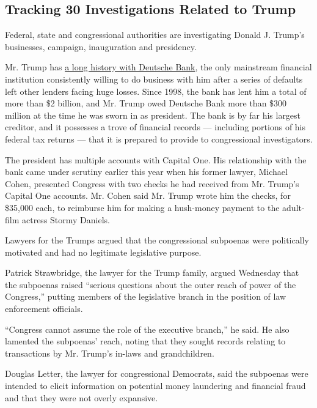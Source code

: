 \hypertarget{tracking-30-investigations-related-to-trump}{%
\subsection{Tracking 30 Investigations Related to
Trump}\label{tracking-30-investigations-related-to-trump}}

Federal, state and congressional authorities are investigating Donald J.
Trump's businesses, campaign, inauguration and presidency.

Mr. Trump has
\href{https://www.nytimes.com/2019/03/18/business/trump-deutsche-bank.html?module=inline}{a
long history with Deutsche Bank}, the only mainstream financial
institution consistently willing to do business with him after a series
of defaults left other lenders facing huge losses. Since 1998, the bank
has lent him a total of more than \$2 billion, and Mr. Trump owed
Deutsche Bank more than \$300 million at the time he was sworn in as
president. The bank is by far his largest creditor, and it possesses a
trove of financial records --- including portions of his federal tax
returns --- that it is prepared to provide to congressional
investigators.

The president has multiple accounts with Capital One. His relationship
with the bank came under scrutiny earlier this year when his former
lawyer, Michael Cohen, presented Congress with two checks he had
received from Mr. Trump's Capital One accounts. Mr. Cohen said Mr. Trump
wrote him the checks, for \$35,000 each, to reimburse him for making a
hush-money payment to the adult-film actress Stormy Daniels.

Lawyers for the Trumps argued that the congressional subpoenas were
politically motivated and had no legitimate legislative purpose.

Patrick Strawbridge, the lawyer for the Trump family, argued Wednesday
that the subpoenas raised ``serious questions about the outer reach of
power of the Congress,'' putting members of the legislative branch in
the position of law enforcement officials.

``Congress cannot assume the role of the executive branch,'' he said. He
also lamented the subpoenas' reach, noting that they sought records
relating to transactions by Mr. Trump's in-laws and grandchildren.

Douglas Letter, the lawyer for congressional Democrats, said the
subpoenas were intended to elicit information on potential money
laundering and financial fraud and that they were not overly expansive.

